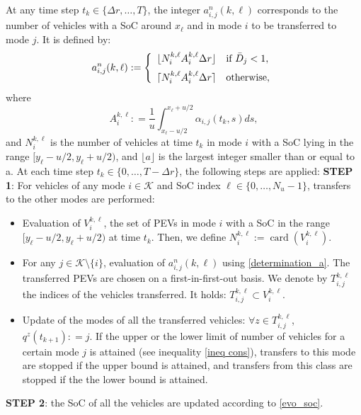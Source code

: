 \documentclass[conference]{IEEEtran}
\DeclareMathOperator{\card}{card}
\def\K{\mathcal{K}}
\begin{document}
At any time step $t_k\in\{\Delta r,\ldots, T\}$, the integer $a^n_{i,j}(k,\ell)$ corresponds to the number of vehicles with a SoC around $x_\ell$ and in mode $i$ to be transferred to mode $j$. It is defined by:
\begin{equation}
\label{determination_a}
a^n_{i,j}(k,\ell) : = \left\{
\begin{array}{ll}
\lfloor 
N_i^{k,\ell} A_i^{k,\ell}\Delta r
\rfloor
 & \mbox{if }\bar{D}_j<1, \vspace{0.2cm} \\
 \lceil 
N_i^{k,\ell} A_i^{k,\ell} \Delta r
\rceil
 & \mbox{otherwise},
\end{array}
\right.
\end{equation} 
where
\begin{equation}
A_i^{k,\ell}: = \frac{1}{u}\int_{x_{\ell}-u/2}^{x_{\ell}+u/2}
\alpha_{i,j}(t_k,s)ds,
\end{equation}
and $N_i^{k,\ell}$ is the number of vehicles at time $t_k$ in mode $i$ with a SoC lying in the range $[y_\ell-u/2,y_\ell+u/2)$, and  $ \lfloor a \rfloor $ is the largest integer smaller than or equal to a.
 At each time step $t_k\in\{0,\ldots,T-\Delta r \}$, the following steps are applied:\newline
\textbf{STEP 1}: For vehicles of any mode $i\in \K$ and SoC index $\ell\in \{0,\ldots,N_u-1\}$, transfers to the other modes are performed:
\begin{itemize}
\item Evaluation of $V_i^{k,\ell}$, the set of PEVs in mode $i$ with a SoC in the range $[y_\ell-u/2,y_\ell+u/2)$ at time $t_k$. Then, we define $N_i^{k,\ell}:= \card(V_i^{k,\ell})$. 
\item For any $j\in\K\setminus\{i\}$, evaluation of $a^n_{i,j}(k,\ell)$ using \eqref{determination_a}. The transferred PEVs are chosen on a first-in-first-out basis. We denote by $T_{i,j}^{k,\ell}$ the indices of the vehicles transferred. It holds: $T_{i,j}^{k,\ell}\subset V_i^{k,\ell}$. \item Update of the modes of all the transferred vehicles: $\forall z \in T_{i,j}^{k,\ell}$, $q^z(t_{k+1}): = j$. If the upper or the lower limit of number of vehicles for a certain mode $j$ is attained (see inequality \eqref{ineq cons}), transfers to this mode are stopped if the upper bound is attained, and transfers from this class are stopped if the the lower bound is attained.
\end{itemize}
\textbf{STEP 2}: the SoC of all the vehicles are updated according to \eqref{evo_soc}.
\end{document}
